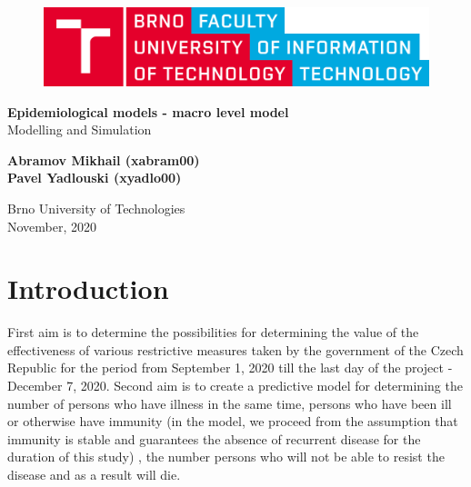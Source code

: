 \documentclass[12pt,a4paper]{article}
\begin{document}
    \begin{titlepage}
        \begin{center}
            \vspace*{1cm}
        
            \begin{figure}[h!]
                \includegraphics[scale=0.12]{VUT-FIT-logo-en.png}
            \end{figure}
            \vspace{1.5cm}

            \Large{\textbf{Epidemiological models - macro level model}} \\
            \large{Modelling and Simulation}

            \vspace{0.5cm}
                
            \vspace{1.5cm}
            
            \textbf{Abramov Mikhail (xabram00)} \\
            \textbf{Pavel Yadlouski (xyadlo00)} 

            \vfill
                
            \vspace{0.8cm}
        
            Brno University of Technologies\\
            November, 2020
                
        \end{center}
    \end{titlepage}

    \tableofcontents
    \newpage

    \section{Introduction}
    First aim is to determine the possibilities for determining the value of the effectiveness of various restrictive measures taken by the government of the Czech Republic for the period from September 1, 2020 till the last day of the project - December 7, 2020.
    Second aim is to create a predictive model for determining the number of persons who have illness in the same time, persons who have been ill or otherwise have immunity
    (in the model, we proceed from the assumption that immunity is stable and guarantees the absence of recurrent disease for the duration of this study)
    , the number persons who will not be able to resist the disease and as a result will die. 
    
\end{document}
